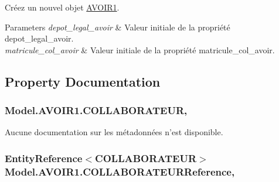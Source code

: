 Créez un nouvel objet \hyperlink{class_model_1_1_a_v_o_i_r1}{A\-V\-O\-I\-R1}. 


\begin{DoxyParams}{Parameters}
{\em depot\-\_\-legal\-\_\-avoir} & Valeur initiale de la propriété depot\-\_\-legal\-\_\-avoir.\\
\hline
{\em matricule\-\_\-col\-\_\-avoir} & Valeur initiale de la propriété matricule\-\_\-col\-\_\-avoir.\\
\hline
\end{DoxyParams}


\subsection{Property Documentation}
\hypertarget{class_model_1_1_a_v_o_i_r1_a5273b2d9565af22f774dda00ee91c887}{
\subsubsection[{C\-O\-L\-L\-A\-B\-O\-R\-A\-T\-E\-U\-R}]{ Model.\-A\-V\-O\-I\-R1.\-C\-O\-L\-L\-A\-B\-O\-R\-A\-T\-E\-U\-R\hspace{0.3cm}{\ttfamily [get]}, {\ttfamily [set]}}}\label{class_model_1_1_a_v_o_i_r1_a5273b2d9565af22f774dda00ee91c887}


Aucune documentation sur les métadonnées n'est disponible. 

\hypertarget{class_model_1_1_a_v_o_i_r1_a466462edad2140953f76962a73beffe5}{
\subsubsection[{C\-O\-L\-L\-A\-B\-O\-R\-A\-T\-E\-U\-R\-Reference}]{\setlength{\rightskip}{0pt plus 5cm}Entity\-Reference$<${\bf C\-O\-L\-L\-A\-B\-O\-R\-A\-T\-E\-U\-R}$>$ Model.\-A\-V\-O\-I\-R1.\-C\-O\-L\-L\-A\-B\-O\-R\-A\-T\-E\-U\-R\-Reference\hspace{0.3cm}{\ttfamily [get]}, {\ttfamily [set]}}}\label{class_model_1_1_a_v_o_i_r1_a466462edad2140953f76962a73beffe5}


